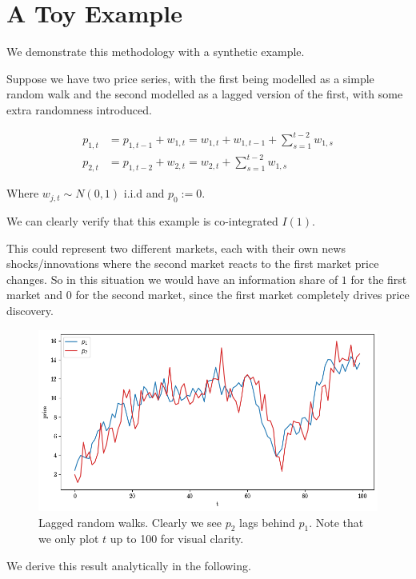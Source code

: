 \section{A Toy Example}
We demonstrate this methodology with a synthetic example.

Suppose we have two price series, with the first being modelled as a simple random walk
and the second modelled as a lagged version of the first, with some extra randomness introduced.

\begin{align}
    p_{1, t} &= p_{1, t-1} + w_{1, t} = w_{1, t} + w_{1, t-1} + \sum_{s=1}^{t-2} w_{1, s} \label{toy1}\\
    p_{2, t} &= p_{1, t-2} + w_{2, t} = w_{2, t} + \sum_{s=1}^{t-2} w_{1, s} \label{toy2}
\end{align}

Where $w_{j, t} \sim N(0, 1)$ i.i.d and $p_0 := 0$.

We can clearly verify that this example is co-integrated $I(1)$.

This could represent two different markets, each with their own news shocks/innovations
where the second market reacts to the first market price changes. So in this
situation we would have an information share of $1$ for the first market and $0$ for the
second market, since the first market completely drives price discovery.

\begin{figure}[htpb]
    \centering
    \includegraphics[width=1.0\textwidth]{./images/lagged_walk.png}
    \caption{Lagged random walks. Clearly we see $p_2$ lags behind $p_1$. Note that we only plot $t$ up to 100 for visual clarity.}
\end{figure}

We derive this result analytically in the following.

